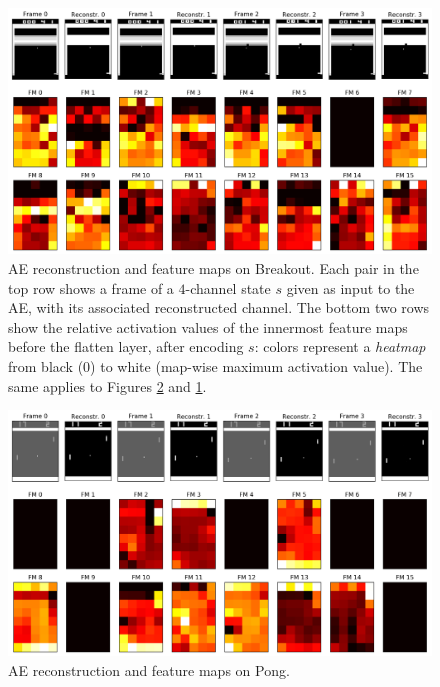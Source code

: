 %
%
\begin{figure}
    \includegraphics[width=\textwidth]{pictures/experiments/reconstr_breakout}
    \centering
    \caption[AE reconstruction and feature maps on Breakout]{AE reconstruction 
	    and feature maps on Breakout. 
	    Each pair in the top row shows a frame of a $4$-channel state $s$ 
	    given as input to the AE, with its associated reconstructed channel. 
	    The bottom two rows show the relative activation values of the 
	    innermost feature maps before the flatten layer, after encoding $s$: 
	    colors represent a \textit{heatmap} from black ($0$) to white 
	    (map-wise maximum activation value). The same applies to Figures 
	    \ref{f:P_reconstr} and \ref{f:BO_reconstr}.}
    \label{f:BO_reconstr}
\end{figure}
%
%
\begin{figure}
    \includegraphics[width=\textwidth]{pictures/experiments/reconstr_pong}
    \centering
    \caption[AE reconstruction and feature maps on Pong]{AE reconstruction 
	    and feature maps on Pong.}
    \label{f:P_reconstr}
\end{figure}
